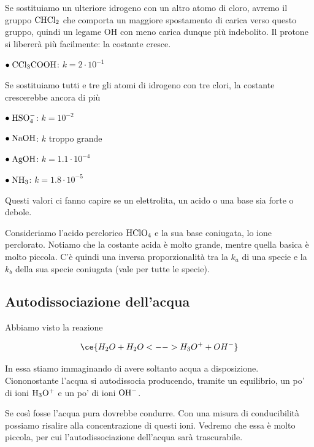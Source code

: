 \vspace{0.2cm}Se sostituiamo un ulteriore idrogeno con un altro atomo di cloro, avremo il gruppo $\rm CHCl_2$ che comporta un maggiore spostamento di carica verso questo gruppo, quindi un legame OH con meno carica dunque più indebolito. Il protone si libererà più facilmente: la costante cresce.

\vspace{0.2cm}$\bullet \; \rm CCl_3COOH$: $k=2 \cdot 10^{-1}$

\vspace{0.2cm}Se sostituiamo tutti e tre gli atomi di idrogeno con tre clori, la costante crescerebbe ancora di più

\vspace{0.2cm}$\bullet \; \rm HSO_4^-$: $k=10^{-2}$

\vspace{0.2cm}$\bullet \; \rm NaOH$: $k$ troppo grande

\vspace{0.2cm}$\bullet \; \rm AgOH$: $k=1.1 \cdot 10^{-4}$

\vspace{0.2cm}$\bullet \; \rm NH_3$: $k=1.8 \cdot 10^{-5}$

\vspace{0.4cm}Questi valori ci fanno capire se un elettrolita, un acido o una base sia forte o debole.

Consideriamo l'acido perclorico $\rm HClO_4$ e la sua base coniugata, lo ione perclorato. Notiamo che la costante acida è molto grande, mentre quella basica è molto piccola. C'è quindi una inversa proporzionalità tra la $k_a$ di una specie e la $k_b$ della sua specie coniugata (vale per tutte le specie).
\newpage
\subsection{Autodissociazione dell'acqua}
Abbiamo visto la reazione

$$\ce{H_2O + H_2O <--> H_3O^+ + OH^-}$$

In essa stiamo immaginando di avere soltanto acqua a disposizione. Ciononostante l'acqua si autodissocia producendo, tramite un equilibrio, un po' di ioni $\rm H_3O^+$ e un po' di ioni $\rm OH^-$.

Se così fosse l'acqua pura dovrebbe condurre. Con una misura di conducibilità possiamo risalire alla concentrazione di questi ioni. Vedremo che essa è molto piccola, per cui l'autodissociazione dell'acqua sarà trascurabile.

